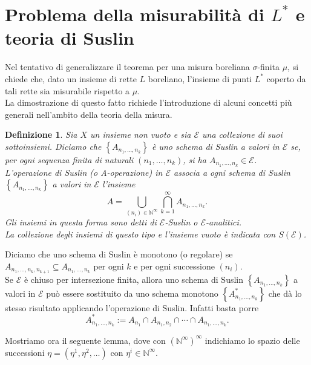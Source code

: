 \documentclass[a4paper, twoside,openright]{article}
\newcommand{\<}{\langle}
\renewcommand{\>}{\rangle}
\newtheorem{defin}[teo]{Definizione}
\begin{document}
\newpage

\section{Problema della misurabilità di $L^*$ e teoria di Suslin}

Nel tentativo di generalizzare il teorema per una misura boreliana $\sigma$-finita $\mu$, si chiede che, dato un insieme di rette $L$ boreliano, l'insieme di punti $L^*$ coperto da tali rette sia misurabile rispetto a $\mu$.\\
La dimostrazione di questo fatto richiede l'introduzione di alcuni concetti più generali nell'ambito della teoria della misura.

\begin{defin}
	Sia $X$ un insieme non vuoto e sia $\mathcal{E}$ una collezione di suoi sottoinsiemi. Diciamo che $\left\{A_{n_{1}, \ldots, n_{k}}\right\}$ è uno schema di Suslin a valori in $\mathcal{E}$ se, per ogni sequenza finita di naturali $\left(n_{1}, \ldots, n_{k}\right)$, si ha $A_{n_{1}, \ldots, n_{k}} \in \mathcal{E}$.\\
	L'operazione di Suslin (o A-operazione) in $\mathcal{E}$ associa a ogni schema di Suslin $\left\{A_{n_{1}, \ldots, n_{k}}\right\}$ a valori in $\mathcal{E}$ l'insieme
	$$
	A=\bigcup_{\left(n_{i}\right) \in \mathbb{N}^{\infty}} \bigcap_{k=1}^{\infty} A_{n_{1}, \ldots, n_{k}} .
	$$
	Gli insiemi in questa forma sono detti di $\mathcal{E}$-Suslin o $\mathcal{E}$-analitici. \\
	La collezione degli insiemi di questo tipo e l'insieme vuoto è indicata con $S(\mathcal{E})$.
\end{defin}	

Diciamo che uno schema di Suslin è monotono (o regolare) se $A_{n_{1}, \ldots, n_{k}, n_{k+1}} \subseteq A_{n_{1}, \ldots, n_{k}}$ per ogni $k$ e per ogni successione $(n_i)$.\\
Se $\mathcal{E}$ è chiuso per intersezione finita, allora uno schema di Suslin $\left\{A_{n_{1}, \ldots, n_{k}}\right\}$ a valori in $\mathcal{E}$ può essere sostituito da uno schema monotono $\left\{A^*_{n_{1}, \ldots, n_{k}}\right\}$ che dà lo stesso risultato applicando l'operazione di Suslin. Infatti basta porre 
$$
A_{n_{1}, \ldots, n_{k}}^{*}:=A_{n_{1}} \cap A_{n_{1}, n_{2}} \cap \cdots \cap A_{n_{1}, \ldots, n_{k}} .
$$

Mostriamo ora il seguente lemma, dove con $\left(\mathbb{N}^{\infty}\right)^{\infty}$ indichiamo lo spazio delle successioni $\eta=\left(\eta^{1}, \eta^{2}, \ldots\right)$ con $\eta^{i} \in \mathbb{N}^{\infty}$.
\end{document}
